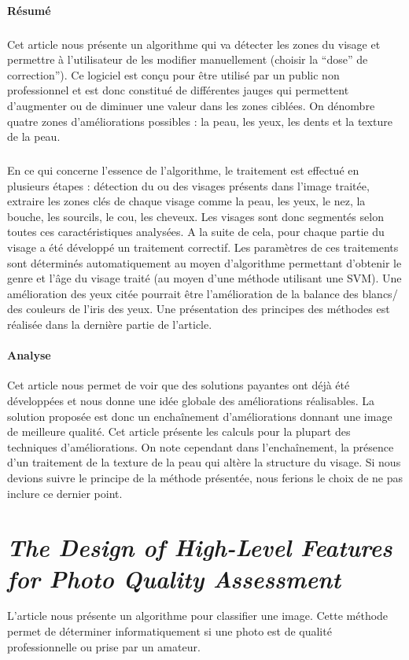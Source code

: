 \documentclass[11pt, french]{report-rd-info}
\begin{document}
\paragraph{Résumé}
\subparagraph{}
Cet article nous présente un algorithme qui va détecter les zones du visage et permettre à l'utilisateur de les modifier manuellement (choisir la “dose” de correction”). Ce logiciel est conçu pour être utilisé par un public non professionnel et est donc constitué de différentes jauges qui permettent d'augmenter ou de diminuer une valeur dans les zones ciblées. On dénombre quatre zones d'améliorations possibles : la peau, les yeux, les dents et la texture de la peau.
\subparagraph{}
En ce qui concerne l’essence de l’algorithme, le traitement est effectué en plusieurs étapes : détection du ou des visages présents dans l’image traitée, extraire les zones clés de chaque visage comme la peau, les yeux, le nez, la bouche, les sourcils, le cou, les cheveux. Les visages sont donc segmentés selon toutes ces caractéristiques analysées. A la suite de cela, pour chaque partie du visage a été développé un traitement correctif. Les paramètres de ces traitements sont déterminés automatiquement au moyen d’algorithme permettant d’obtenir le genre et l’âge du visage traité (au moyen d’une méthode utilisant une SVM).
Une amélioration des yeux citée pourrait être l’amélioration de la balance des blancs/ des couleurs de l’iris des yeux. Une présentation des principes des méthodes est réalisée dans la dernière partie de l’article.
\paragraph{Analyse}
Cet article nous permet de voir que des solutions payantes ont déjà été développées et nous donne une idée globale des améliorations réalisables. La solution proposée est donc un enchaînement d’améliorations donnant une image de meilleure qualité.
Cet article présente les calculs pour la plupart des techniques d’améliorations. On note cependant dans l'enchaînement, la présence d’un traitement de la texture de la peau qui altère la structure du visage. Si nous devions suivre le principe de la méthode présentée, nous ferions le choix de ne pas inclure ce dernier point.
\section{\emph{The Design of High-Level Features for Photo Quality Assessment}}
L'article \cite{Ke} nous présente un algorithme pour classifier une image. Cette méthode permet de déterminer informatiquement si une photo est de qualité professionnelle ou prise par un amateur.
\end{document}
